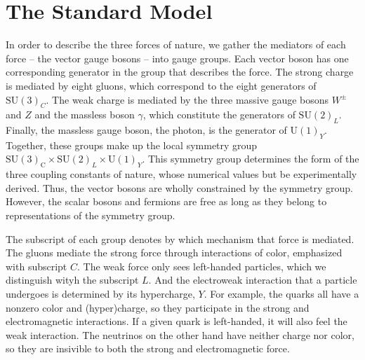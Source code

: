 % 

% 
\section{The Standard Model}\label{ch:SM}
In order to describe the three forces of nature, we gather the mediators of each force -- the vector gauge bosons -- into gauge groups. 
Each vector boson has one corresponding generator in the group that describes the force. 
The strong charge is mediated by eight gluons, which correspond to the eight generators of $\text{SU}(3)_C$. 
The weak charge is mediated by the three massive gauge bosons $W^\pm$ and $Z$ and the massless boson $\gamma$, 
which constitute the generators of $\text{SU}(2)_L$. Finally, the massless gauge boson, the photon, is the generator of $\text{U}(1)_Y$. 
Together, these groups make up the local symmetry group $\mathrm{SU}(3)_{\mathrm{C}} \times \mathrm{SU}(2)_{L} \times \mathrm{U}(1)_{Y}$. 
This symmetry group determines the form of the three coupling constants of nature, whose numerical values but be experimentally derived. 
Thus, the vector bosons are wholly constrained by the symmetry group. However, the scalar bosons and fermions are free as long as they
 belong to representations of the symmetry group. 

The subscript of each group denotes by which mechanism that force is mediated. The gluons mediate the strong force through interactions of color, emphasized with subscript $C$. The weak force only sees left-handed particles, 
which we distinguish wityh the subscript $L$. And the electroweak interaction that a particle undergoes is determined by its hypercharge, $Y$. For example, the quarks all have a nonzero color and (hyper)charge, so they participate in the strong and electromagnetic interactions. If a given quark is left-handed, it will also feel the weak interaction. The neutrinos on the other hand have neither charge nor color, so they are insivible to both the strong and electromagnetic force.

